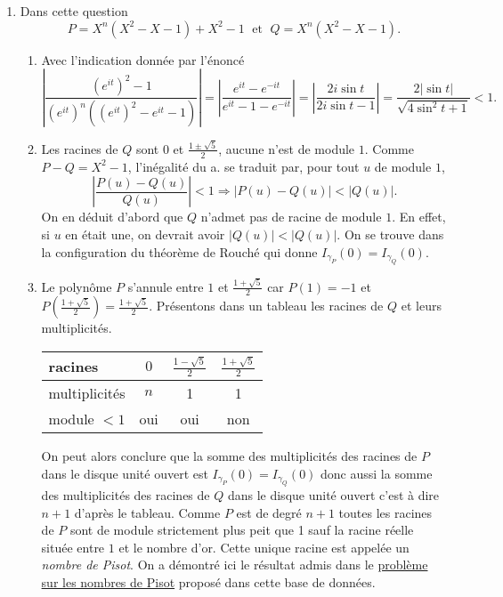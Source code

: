 \begin{enumerate}
\begin{enumerate}
\end{enumerate}


 \item Dans cette question
\[
 P = X^n(X^2 - X - 1) + X^2 -1 \; \text{ et } \; Q = X^n(X^2 - X - 1).
\]

\begin{enumerate}
 \item Avec l'indication donnée par l'énoncé
\[
\left| \frac{(e^{it})^2 - 1}{(e^{it})^n\left( (e^{it})^2 - e^{it} - 1\right) }\right|
= \left| \frac{e^{it} - e^{-it}}{e^{it} - 1 - e^{-it} }\right|
= \left| \frac{2i \sin t}{2i\sin t - 1}\right|
= \frac{2|\sin t|}{\sqrt{4\sin^2 t + 1}} < 1.
\]

 \item Les racines de $Q$ sont $0$ et $\frac{1\pm\sqrt{5}}{2}$, aucune n'est de module $1$. Comme $P - Q = X^2 -1$, l'inégalité du a. se traduit par, pour tout $u$ de module $1$,
\[
  \left|\frac{P(u) - Q(u)}{Q(u)}\right| < 1 \Rightarrow \left|P(u) - Q(u) \right| < |Q(u)|.
\]
On en déduit d'abord que $Q$ n'admet pas de racine de module $1$. En effet, si $u$ en était une, on devrait avoir $|Q(u)| < |Q(u)|$. On se trouve dans la configuration du théorème de Rouché qui donne $I_{\gamma_P}(0) = I_{\gamma_Q}(0)$.

 \item Le polynôme $P$ s'annule entre $1$ et $\frac{1+\sqrt{5}}{2}$ car $P(1) = -1$ et $P(\frac{1+\sqrt{5}}{2}) = \frac{1+\sqrt{5}}{2}$.\newline
Présentons dans un tableau les racines de $Q$ et leurs multiplicités.
\begin{center}
\renewcommand{\arraystretch}{1.7}
\begin{tabular}{|l|c|c|c|} \hline
racines       & $0$ & $\frac{1-\sqrt{5}}{2}$ & $\frac{1+\sqrt{5}}{2}$ \\ \hline
multiplicités & $n$ & 1                      & 1\\ \hline
module $< 1$  & oui & oui                    & non \\ \hline
\end{tabular}
\end{center}
On peut alors conclure que la somme des multiplicités des racines de $P$ dans le disque unité ouvert est $I_{\gamma_P}(0) = I_{\gamma_Q}(0)$ donc aussi la somme des multiplicités des racines de $Q$ dans le disque unité ouvert c'est à dire $n+1$ d'après le tableau. Comme $P$ est de degré $n+1$ toutes les racines de $P$ sont de module strictement plus peit que 1 sauf la racine réelle située entre $1$ et le nombre d'or.\newline
Cette unique racine est appelée un \emph{nombre de Pisot}. On a démontré ici le résultat admis dans le \href{\textesurl Apisot.pdf}{problème sur les nombres de Pisot} proposé dans cette base de données.

\end{enumerate}
\end{enumerate}

